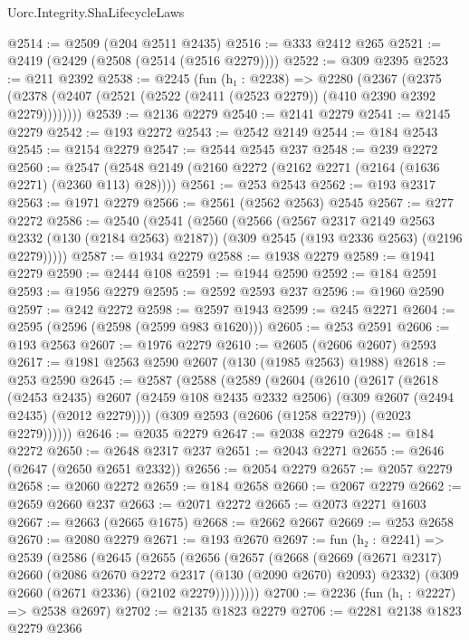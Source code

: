 \begin{lexlean}{Uorc.Integrity.ShaLifecycleLaws}
\begin{coremodule}
@2514 := @2509 (@204 @2511 @2435)
@2516 := @333 @2412 @265
@2521 := @2419 (@2429 (@2508 (@2514 (@2516 @2279))))
@2522 := @309 @2395
@2523 := @211 @2392
@2538 := @2245
    (fun (h₁ : @2238) =>
    @2280
      (@2367
        (@2375 (@2378 (@2407 (@2521 (@2522 (@2411 (@2523 @2279)) (@410 @2390 @2392 @2279))))))))
@2539 := @2136 @2279
@2540 := @2141 @2279
@2541 := @2145 @2279
@2542 := @193 @2272
@2543 := @2542 @2149
@2544 := @184 @2543
@2545 := @2154 @2279
@2547 := @2544 @2545 @237
@2548 := @239 @2272
@2560 := @2547 (@2548 @2149 (@2160 @2272 (@2162 @2271 (@2164 (@1636 @2271) (@2360 @113) @28))))
@2561 := @253 @2543
@2562 := @193 @2317
@2563 := @1971 @2279
@2566 := @2561 (@2562 @2563) @2545
@2567 := @277 @2272
@2586 := @2540
    (@2541
      (@2560
        (@2566
          (@2567 @2317 @2149 @2563 @2332 (@130 (@2184 @2563) @2187))
          (@309 @2545 (@193 @2336 @2563) (@2196 @2279)))))
@2587 := @1934 @2279
@2588 := @1938 @2279
@2589 := @1941 @2279
@2590 := @2444 @108
@2591 := @1944 @2590
@2592 := @184 @2591
@2593 := @1956 @2279
@2595 := @2592 @2593 @237
@2596 := @1960 @2590
@2597 := @242 @2272
@2598 := @2597 @1943
@2599 := @245 @2271
@2604 := @2595 (@2596 (@2598 (@2599 @983 @1620)))
@2605 := @253 @2591
@2606 := @193 @2563
@2607 := @1976 @2279
@2610 := @2605 (@2606 @2607) @2593
@2617 := @1981 @2563 @2590 @2607 (@130 (@1985 @2563) @1988)
@2618 := @253 @2590
@2645 := @2587
    (@2588
      (@2589
        (@2604
          (@2610
            (@2617
              (@2618
                (@2453 @2435)
                @2607
                (@2459 @108 @2435 @2332 @2506)
                (@309 @2607 (@2494 @2435) (@2012 @2279))))
            (@309 @2593 (@2606 (@1258 @2279)) (@2023 @2279))))))
@2646 := @2035 @2279
@2647 := @2038 @2279
@2648 := @184 @2272
@2650 := @2648 @2317 @237
@2651 := @2043 @2271
@2655 := @2646 (@2647 (@2650 @2651 @2332))
@2656 := @2054 @2279
@2657 := @2057 @2279
@2658 := @2060 @2272
@2659 := @184 @2658
@2660 := @2067 @2279
@2662 := @2659 @2660 @237
@2663 := @2071 @2272
@2665 := @2073 @2271 @1603
@2667 := @2663 (@2665 @1675)
@2668 := @2662 @2667
@2669 := @253 @2658
@2670 := @2080 @2279
@2671 := @193 @2670
@2697 := fun (h₂ : @2241) =>
  @2539
    (@2586
      (@2645
        (@2655
          (@2656
            (@2657
              (@2668
                (@2669
                  (@2671 @2317)
                  @2660
                  (@2086 @2670 @2272 @2317 (@130 (@2090 @2670) @2093) @2332)
                  (@309 @2660 (@2671 @2336) (@2102 @2279)))))))))
@2700 := @2236 (fun (h₁ : @2227) => @2538 @2697)
@2702 := @2135 @1823 @2279
@2706 := @2281 @2138 @1823 @2279 @2366

\end{coremodule}
\end{lexlean}
